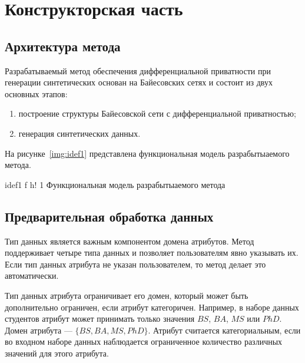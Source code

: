 \chapter{Конструкторская часть}

\section{Архитектура метода}

Разрабатываемый метод обеспечения дифференциальной приватности при генерации синтетических основан на Байесовских сетях и состоит из двух основных этапов:
\begin{enumerate}[label*=---]
	\item построение структуры Байесовской сети с дифференциальной приватностью;
	\item генерация синтетических данных.
\end{enumerate}

На рисунке~\ref{img:idef1} представлена функциональная модель разрабытыаемого метода.

{idef1} %
{f} %
{h!} %
{1\textwidth} %
{Функциональная модель разрабытыаемого метода} %

\section{Предварительная обработка данных}

Тип данных является важным компонентом домена атрибутов.
Метод поддерживает четыре типа данных и позволяет пользователям явно указывать их.
Если тип данных атрибута не указан пользователем, то метод делает это автоматически.


Тип данных атрибута ограничивает его домен, который может быть дополнительно ограничен, если атрибут категоричен.
Например, в наборе данных студентов атрибут может принимать только значения $BS$, $BA$, $MS$ или $PhD$.
Домен атрибута --- $\{BS, BA, MS, PhD\}$.
Атрибут считается категориальным, если во входном наборе данных наблюдается ограниченное количество различных значений для этого атрибута.

